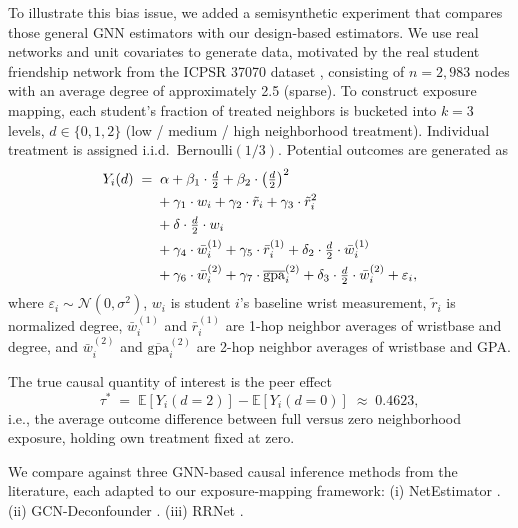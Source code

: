 \documentclass{article}
\theoremstyle{plain}
\theoremstyle{definition}
\theoremstyle{remark}
\begin{document}
To illustrate this bias issue, we added a semisynthetic experiment that compares those general GNN estimators with our design-based estimators. We use real networks and unit covariates to generate data, motivated by the real student friendship network from the ICPSR 37070 dataset
\citep{aronow2017estimating}, consisting of $n = 2{,}983$ nodes with an average
degree of approximately 2.5 (sparse). To construct exposure mapping, each student's fraction of treated neighbors is bucketed into $k = 3$ levels,
$d \in \{0, 1, 2\}$ (low / medium / high neighborhood treatment). Individual
treatment is assigned i.i.d.\ $\mathrm{Bernoulli}(1/3)$. 
Potential outcomes are generated as
\begin{align}
  Y_i(d) \;=\;
    &\;\alpha
     + \beta_1 \cdot \tfrac{d}{2}
     + \beta_2 \cdot \bigl(\tfrac{d}{2}\bigr)^2 \notag \\
    &+ \gamma_1 \cdot w_i
     + \gamma_2 \cdot \tilde{r}_i
     + \gamma_3 \cdot \tilde{r}_i^2 \notag \\
    &+ \delta \cdot \tfrac{d}{2} \cdot w_i \notag \\
    &+ \gamma_4 \cdot \bar{w}_i^{(1)}
     + \gamma_5 \cdot \bar{r}_i^{(1)}
     + \delta_2 \cdot \tfrac{d}{2} \cdot \bar{w}_i^{(1)} \notag \\
    &+ \gamma_6 \cdot \bar{w}_i^{(2)}
     + \gamma_7 \cdot \overline{\mathrm{gpa}}_i^{(2)}
     + \delta_3 \cdot \tfrac{d}{2} \cdot \bar{w}_i^{(2)}
     + \varepsilon_i, \label{eq:dgp}
\end{align}
where $\varepsilon_i \sim \mathcal{N}(0, \sigma^2)$,
$w_i$ is student $i$'s baseline wrist measurement,
$\tilde{r}_i$ is normalized degree,
$\bar{w}_i^{(1)}$ and $\bar{r}_i^{(1)}$ are 1-hop neighbor averages of
wristbase and degree, and $\bar{w}_i^{(2)}$ and
$\overline{\mathrm{gpa}}_i^{(2)}$ are 2-hop neighbor averages of wristbase and
GPA. 

The true causal quantity of interest is the peer effect
\begin{equation}
  \tau^* \;=\; \mathbb{E}[Y_i(d{=}2)] - \mathbb{E}[Y_i(d{=}0)]
         \;\approx\; 0.4623,
\end{equation}
i.e., the average outcome difference between full versus zero neighborhood
exposure, holding own treatment fixed at zero.


We compare against three GNN-based causal inference methods from the literature,
each adapted to our exposure-mapping framework: (i) NetEstimator \citep{jiang2022estimating}. (ii) GCN-Deconfounder \citep{guo2020learning}.  (iii) RRNet \citep{cai2023generalization}. 
\end{document}
